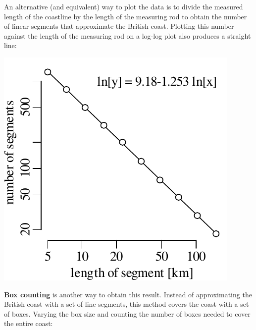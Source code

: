 An alternative (and equivalent) way to plot the data is to divide the
measured length of the coastline by the length of the measuring rod to
obtain the number of linear segments that approximate the British
coast.  Plotting this number against the length of the measuring rod
on a log-log plot also produces a straight line:

\noindent\begin{minipage}[t][][b]{.3\textwidth}
  \includegraphics[width=\textwidth]{../figures/fractaldimbritain.pdf}\\
\end{minipage}
\begin{minipage}[t][][t]{.7\textwidth}
  \label{fig:fractaldimbritain}
\end{minipage}

\textbf{Box counting} is another way to obtain this result. Instead of
approximating the British coast with a set of line segments, this
method covers the coast with a set of boxes. Varying the box size and
counting the number of boxes needed to cover the entire coast:\\

